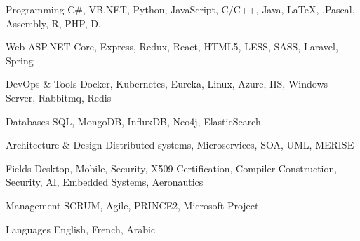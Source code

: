 

\begin{cvskills}

  \cvskill
    {Programming} %
    {C\#, VB.NET, Python, JavaScript, C/C++, Java, LaTeX, ,Pascal, Assembly, R, PHP, D, } %

  \cvskill
    {Web} %
    {ASP.NET Core, Express, Redux, React, HTML5, LESS, SASS, Laravel, Spring} %

  \cvskill
    {DevOps \& Tools} %
    {Docker, Kubernetes, Eureka, Linux, Azure, IIS, Windows Server, Rabbitmq, Redis} %
    
  \cvskill
    {Databases} %
    {SQL, MongoDB, InfluxDB, Neo4j, ElasticSearch} %

  \cvskill
    {Architecture \& Design} %
    {Distributed systems, Microservices, SOA, UML, MERISE} %
    
  \cvskill
    {Fields} %
    {Desktop, Mobile, Security, X509 Certification, Compiler Construction, Security, AI, Embedded Systems, Aeronautics} %
    
   
  \cvskill
    {Management} %
    {SCRUM, Agile, PRINCE2, Microsoft Project} %
    
  \cvskill
    {Languages} %
    {English, French, Arabic} %

\end{cvskills}
